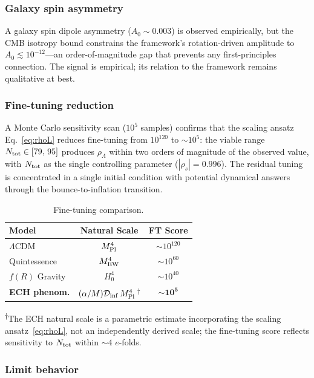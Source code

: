 \documentclass[aps,prd,twocolumn,superscriptaddress,showpacs,preprintnumbers,
  nofootinbib,longbibliography,floatfix]{revtex4-2}
\newcommand{\Dinf}{\mathcal{D}_{\rm inf}}
\newcommand{\MPl}{M_{\rm Pl}}
\begin{document}
\subsubsection{Galaxy spin asymmetry}

A galaxy spin dipole asymmetry ($A_0 \sim 0.003$) is observed
empirically, but the CMB isotropy bound constrains the framework's
rotation-driven amplitude to $A_0 \lesssim 10^{-12}$---an
order-of-magnitude gap that prevents any first-principles connection.
The signal is empirical; its relation to the framework remains
qualitative at best.

\subsubsection{Fine-tuning reduction}

A Monte Carlo sensitivity scan ($10^5$ samples) confirms that the
scaling ansatz Eq.~\eqref{eq:rhoL} reduces fine-tuning from $10^{120}$
to $\sim\!10^5$: the viable range $N_{\rm tot} \in [79,\,95]$ produces
$\rho_\Lambda$ within two orders of magnitude of the observed value,
with $N_{\rm tot}$ as the single controlling parameter ($|\rho_s| =
0.996$). The residual tuning is concentrated in a single initial
condition with potential dynamical answers through the
bounce-to-inflation transition.

\begin{table}[h]
\caption{\label{tab:finetuning} Fine-tuning comparison.}
\begin{ruledtabular}
\begin{tabular}{lcc}
Model & Natural Scale & FT Score \\
\hline
$\Lambda$CDM & $\MPl^4$ & $\sim 10^{120}$ \\
Quintessence & $M_{\rm EW}^4$ & $\sim 10^{60}$ \\
$f(R)$ Gravity & $H_0^4$ & $\sim 10^{40}$ \\
\textbf{ECH phenom.} & $(\alpha/M)\Dinf\,\MPl^4$\,\textsuperscript{$\dagger$} & $\sim\mathbf{10^{5}}$ \\
\end{tabular}
\end{ruledtabular}
\textsuperscript{$\dagger$}The ECH natural scale is a parametric
estimate incorporating the scaling ansatz~\eqref{eq:rhoL}, not an
independently derived scale; the fine-tuning score reflects sensitivity
to $N_{\rm tot}$ within ${\sim}4$ $e$-folds.
\end{table}

\subsubsection{Limit behavior}
\end{document}
